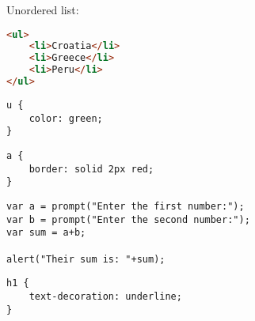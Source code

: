 \documentclass[]{memoir}
\begin{document}
Unordered list:

\begin{lstlisting}[language=HTML]
<ul>
    <li>Croatia</li>
    <li>Greece</li>
    <li>Peru</li>
</ul>
\end{lstlisting}


\begin{lstlisting}
u {
    color: green;
}
\end{lstlisting}


\begin{lstlisting}
a {
    border: solid 2px red;
}
\end{lstlisting}


\begin{lstlisting}
var a = prompt("Enter the first number:");
var b = prompt("Enter the second number:");
var sum = a+b;

alert("Their sum is: "+sum);
\end{lstlisting}


\begin{lstlisting}
h1 {
    text-decoration: underline;
}
\end{lstlisting}

\end{document}
